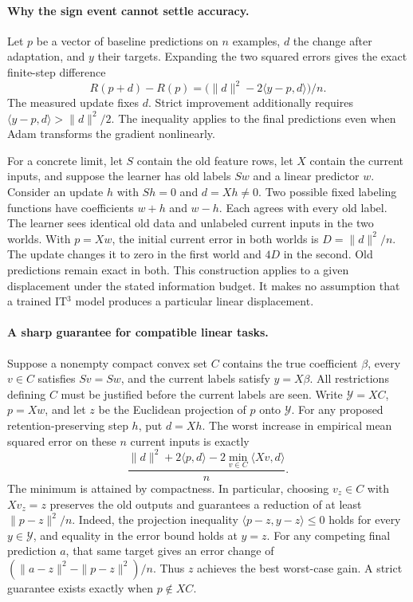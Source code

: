 \documentclass[11pt,a4paper]{article}
\begin{document}
\paragraph{Why the sign event cannot settle accuracy.}
Let $p$ be a vector of baseline predictions on $n$ examples, $d$ the
change after adaptation, and $y$ their targets. Expanding the two squared
errors gives the exact finite-step difference
\[
 R(p+d)-R(p)=\bigl(\|d\|^2-2\langle y-p,d\rangle\bigr)/n .
\]
The measured update fixes $d$. Strict improvement additionally requires
$\langle y-p,d\rangle>\|d\|^2/2$. The inequality applies to the final
predictions even when Adam transforms the gradient nonlinearly.

For a concrete limit, let $S$ contain the old feature rows, let $X$ contain
the current inputs, and suppose the learner has old labels $Sw$ and a
linear predictor $w$. Consider an update $h$ with $Sh=0$ and $d=Xh\ne0$.
Two possible fixed labeling functions have coefficients $w+h$ and $w-h$.
Each agrees with every old label. The learner sees identical old data and
unlabeled current inputs in the two worlds. With $p=Xw$, the initial
current error in both worlds is $D=\|d\|^2/n$. The update changes it to
zero in the first world and $4D$ in the second. Old predictions remain
exact in both. This construction applies to a given displacement under
the stated information budget. It makes no assumption that a trained
IT$^3$ model produces a particular linear displacement.

\paragraph{A sharp guarantee for compatible linear tasks.}
Suppose a nonempty compact convex set $C$ contains the true coefficient
$\beta$, every $v\in C$ satisfies $Sv=Sw$, and the current labels satisfy
$y=X\beta$. All restrictions defining $C$ must be justified before the
current labels are seen. Write $\mathcal Y=XC$, $p=Xw$, and let $z$ be
the Euclidean projection of $p$ onto $\mathcal Y$. For any proposed
retention-preserving step $h$, put $d=Xh$. The worst increase in empirical
mean squared error on these $n$ current inputs is exactly
\[
 \frac{\|d\|^2+2\langle p,d\rangle
             -2\min_{v\in C}\langle Xv,d\rangle}{n}.
\]
The minimum is attained by compactness. In particular, choosing $v_z\in C$
with $Xv_z=z$ preserves the old outputs and guarantees a reduction of at
least $\|p-z\|^2/n$. Indeed, the projection inequality
$\langle p-z,y-z\rangle\leq0$ holds for every $y\in\mathcal Y$, and
equality in the error bound holds at $y=z$. For any competing final
prediction $a$, that same target gives an error change of
$(\|a-z\|^2-\|p-z\|^2)/n$. Thus $z$ achieves the best worst-case gain.
A strict guarantee exists exactly when $p\notin XC$.
\end{document}

